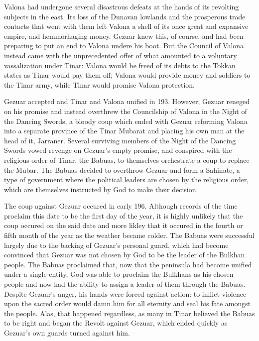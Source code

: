					Valona had undergone several disastrous defeats at the hands of its revolting subjects in the east. Its loss of the Dunavan lowlands and the prosperous trade contacts that went with them left Valona a shell of its once great and expansive empire, and hemmorhaging money. Gezuar knew this, of course, and had been preparing to put an end to Valona undere his boot. But the Council of Valona instead came with the unprecedented offer of what amounted to a voluntary vassalization under Tinar: Valona would be freed of its debts to the Tokkan states as Tinar would pay them off; Valona would provide money and soldiers to the Tinar army, while Tinar would promise Valona protection.
					
					Gezuar accepted and Tinar and Valona unified in 193. However, Gezuar reneged on his promise and instead overthrew the Councilship of Valona in the Night of the Dancing Swords, a bloody coup which ended with Gezuar reforming Valona into a separate province of the Tinar Mubarat and placing his own man at the head of it, Jarraner. Several surviving members of the Night of the Dancing Swords vowed revenge on Gezuar's empty promise, and conspired with the religious order of Tinar, the Babuas, to themselves orchestrate a coup to replace the Mubar. The Babuas decided to overthrow Gezuar and form a Sahinate, a type of government where the political leaders are chosen by the religious order, which are themselves instructed by God to make their decision. 
					
					The coup against Gezuar occured in early 196. Although records of the time proclaim this date to be the first day of the year, it is highly unlikely that the coup occured on the said date and more likley that it occured in the fourth or fifth month of the year as the weather became colder. The Babuas were successful largely due to the backing of Gezuar's personal guard, which had become convinced that Gezuar was not chosen by God to be the leader of the Bulkhan people. The Babuas proclaimed that, now that the peninsula had become unified under a single entity, God was able to proclaim the Bulkhans as his chosen people and now had the ability to assign a leader of them through the Babuas. Despite Gezuar's anger, his hands were forced against action: to inflict violence upon the sacred order would damn him for all eternity and seal his fate amongst the people. Alas, that happened regardless, as many in Tinar believed the Babuas to be right and began the Revolt against Gezuar, which ended quickly as Gezuar's own guards turned against him. 
					
